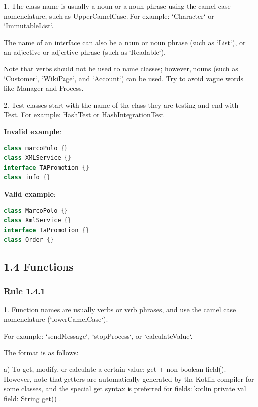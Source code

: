 1.	The class name is usually a noun or a noun phrase using the camel case nomenclature, such as UpperCamelCase. For example: `Character` or `ImmutableList`.

The name of an interface can also be a noun or noun phrase (such as `List`), or an adjective or adjective phrase (such as `Readable`).

Note that verbs should not be used to name classes; however, nouns (such as `Customer`, `WikiPage`, and `Account`) can be used. Try to avoid vague words like Manager and Process.



2.	Test classes start with the name of the class they are testing and end with Test. For example: HashTest or HashIntegrationTest



\textbf{Invalid example}:

\begin{lstlisting}[language=Kotlin]
class marcoPolo {}
class XMLService {}
interface TAPromotion {}
class info {}
\end{lstlisting}


\textbf{Valid example}:

\begin{lstlisting}[language=Kotlin]
class MarcoPolo {}
class XmlService {}
interface TaPromotion {}
class Order {}
\end{lstlisting}


\subsection*{\textbf{1.4 Functions}}

\subsubsection*{\textbf{Rule 1.4.1}}
\leavevmode\newline



1.	Function names are usually verbs or verb phrases, and use the camel case nomenclature (`lowerCamelCase`).

For example: `sendMessage`, `stopProcess`, or `calculateValue`.

The format is as follows:



a) To get, modify, or calculate a certain value: get + non-boolean field(). However, note that getters are automatically generated by the Kotlin compiler for some classes, and the special get syntax is preferred for fields: kotlin private val field: String get() { }.

